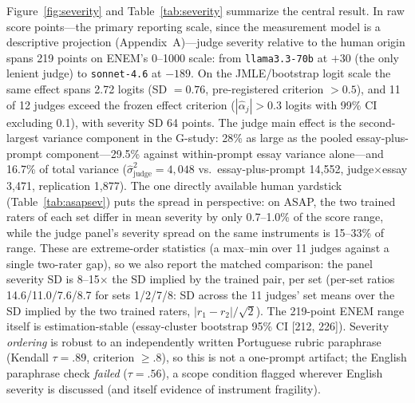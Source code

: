 \documentclass[fleqn,10pt]{JLA_article}
\begin{document}


Figure~\ref{fig:severity} and Table~\ref{tab:severity} summarize the central result. In raw score points---the primary reporting scale, since the measurement model is a descriptive projection (Appendix~A)---judge severity relative to the human origin spans 219 points on ENEM's 0--1000 scale: from \texttt{llama3.3-70b} at $+30$ (the only lenient judge) to \texttt{sonnet-4.6} at $-189$. On the JMLE/bootstrap logit scale the same effect spans 2.72 logits (SD $=0.76$, pre-registered criterion $>0.5$), and 11 of 12 judges exceed the frozen effect criterion ($|\hat\alpha_j| > 0.3$ logits with 99\% CI excluding 0.1), with
severity SD 64 points. The judge main effect is the second-largest variance component in the
G-study: 28\% as large as the pooled essay-plus-prompt component---29.5\% against within-prompt essay variance alone---and 16.7\% of total variance ($\hat\sigma^2_{\text{judge}} = 4{,}048$ vs.\ essay-plus-prompt 14{,}552, judge$\times$essay 3{,}471,
replication 1{,}877). 
The one directly available human yardstick (Table~\ref{tab:asapsev}) puts the spread in perspective: on ASAP, the two trained raters of each set differ in mean severity by only 0.7--1.0\% of the score range, while the judge panel's severity spread on the same instruments is 15--33\% of range. These are extreme-order statistics (a max--min over 11 judges against a single two-rater gap), so we also report the matched comparison: the panel severity SD is 8--15$\times$ the SD implied by the trained pair, per set (per-set ratios 14.6/11.0/7.6/8.7 for sets 1/2/7/8: SD across the 11 judges' set means over the SD implied by the two trained raters, $|r_1-r_2|/\sqrt{2}$). The 219-point ENEM range itself is estimation-stable (essay-cluster bootstrap 95\% CI [212, 226]). Severity
\emph{ordering} is robust to an independently written Portuguese rubric paraphrase (Kendall $\tau = .89$, criterion $\geq .8$), so this is not a one-prompt artifact; the English paraphrase check \emph{failed} ($\tau = .56$), a scope condition flagged wherever English severity is discussed (and itself evidence of instrument fragility).
\end{document}

